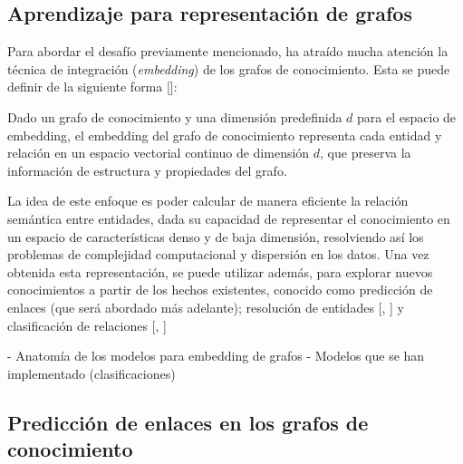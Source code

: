 \subsection{Aprendizaje para representación de grafos}

Para abordar el desafío previamente mencionado, ha atraído mucha atención la técnica de integración (\textit{embedding}) de los grafos de conocimiento. Esta se puede definir de la siguiente forma [\cite{dai}]:
\begin{center}
    Dado un grafo de conocimiento y una dimensión predefinida $d$ para el espacio de embedding, el embedding del grafo de conocimiento representa cada entidad y relación en un espacio vectorial continuo de dimensión $d$, que preserva la información de estructura y propiedades del grafo.
\end{center}

La idea de este enfoque es poder calcular de manera eficiente la relación semántica entre entidades, dada su capacidad de representar el conocimiento en un espacio de características denso y de baja dimensión, resolviendo así los problemas de complejidad computacional y dispersión en los datos. Una vez obtenida esta representación, se puede utilizar además, para explorar nuevos conocimientos a partir de los hechos existentes, conocido como predicción de enlaces (que será abordado más adelante); resolución de entidades [\cite{entityres1}, \cite{entityres2}] y clasificación de relaciones [\cite{relclas1}, \cite{relclas2}]

- Anatomía de los modelos para embedding de grafos
- Modelos que se han implementado (clasificaciones)

\subsection{Predicción de enlaces en los grafos de conocimiento}
